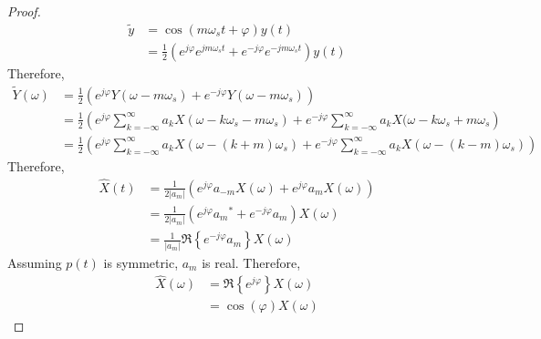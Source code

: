 \documentclass[titlepage, fleqn, a4paper, 12pt, twoside]{article}
\theoremstyle{definition}
\theoremstyle{theorem}
\renewcommand{\tilde}{\widetilde}
\begin{document}
\begin{proof}
	\begin{align*}
		\tilde{y} &= \cos(m \omega_s t + \varphi) y(t)\\
		&= \frac{1}{2} \left( e^{j \varphi} e^{j m \omega_s t} + e^{-j \varphi} e^{-j m \omega_s t} \right) y(t)
	\end{align*}
	Therefore,
	\begin{align*}
		\tilde{Y}(\omega) &= \frac{1}{2} \left( e^{j \varphi} Y(\omega - m \omega_s) + e^{-j \varphi} Y(\omega - m \omega_s) \right)\\
		&= \frac{1}{2} \left( e^{j \varphi} \sum\limits_{k = -\infty}^{\infty} a_k X(\omega - k \omega_s - m \omega_s) + e^{-j \varphi} \sum\limits_{k = -\infty}^{\infty} a_k X(\omega - k \omega_s + m \omega_s \right)\\
		&= \frac{1}{2} \left( e^{j \varphi} \sum\limits_{k = -\infty}^{\infty} a_k X\left( \omega - (k + m) \omega_s \right) + e^{-j \varphi} \sum\limits_{k = -\infty}^{\infty} a_k X\left( \omega - (k - m) \omega_s \right) \right)
	\end{align*}
	Therefore,
	\begin{align*}
		\hat{X}(t) &= \frac{1}{2 |a_m|} \left( e^{j \varphi} a_{-m} X(\omega) + e^{j \varphi} a_m X(\omega) \right)\\
		&= \frac{1}{2 |a_m|} \left( e^{j \varphi} {a_m}^* + e^{-j \varphi} a_m \right) X(\omega)\\
		&= \frac{1}{|a_m|} \Re\left\{ e^{-j \varphi} a_m \right\} X(\omega)
	\end{align*}
	Assuming $p(t)$ is symmetric, $a_m$ is real.
	Therefore,
	\begin{align*}
		\hat{X}(\omega) &= \Re\left\{ e^{j \varphi} \right\} X(\omega)\\
		&= \cos(\varphi) X(\omega)
	\end{align*}
\end{proof}
\end{document}
